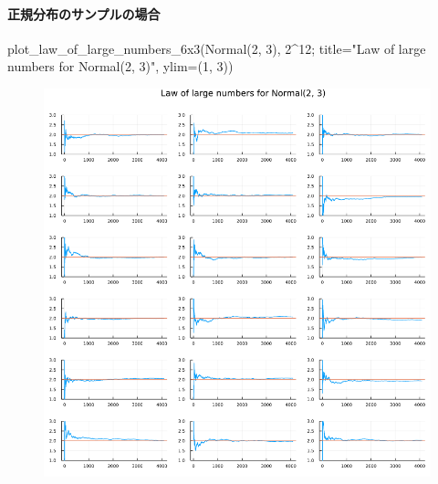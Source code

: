\documentclass[
  letterpaper,
  DIV=11,
  numbers=noendperiod]{scrartcl}
\let\oldparagraph\paragraph
\renewcommand{\paragraph}[1]{\oldparagraph{#1}\mbox{}}
\newenvironment{Shaded}{\begin{snugshade}}{\end{snugshade}}
\newcommand{\FloatTok}[1]{\textcolor[rgb]{0.68,0.00,0.00}{#1}}
\newcommand{\FunctionTok}[1]{\textcolor[rgb]{0.28,0.35,0.67}{#1}}
\newcommand{\NormalTok}[1]{\textcolor[rgb]{0.00,0.23,0.31}{#1}}
\newcommand{\OperatorTok}[1]{\textcolor[rgb]{0.37,0.37,0.37}{#1}}
\newcommand{\StringTok}[1]{\textcolor[rgb]{0.13,0.47,0.30}{#1}}
\begin{document}
\hypertarget{ux6b63ux898fux5206ux5e03ux306eux30b5ux30f3ux30d7ux30ebux306eux5834ux5408}{%
\paragraph{正規分布のサンプルの場合}\label{ux6b63ux898fux5206ux5e03ux306eux30b5ux30f3ux30d7ux30ebux306eux5834ux5408}}

\begin{Shaded}
\begin{Highlighting}[]
\FunctionTok{plot\_law\_of\_large\_numbers\_6x3}\NormalTok{(}\FunctionTok{Normal}\NormalTok{(}\FloatTok{2}\NormalTok{, }\FloatTok{3}\NormalTok{), }\FloatTok{2}\OperatorTok{\^{}}\FloatTok{12}\NormalTok{;}
\NormalTok{    title}\OperatorTok{=}\StringTok{"Law of large numbers for Normal(2, 3)"}\NormalTok{, ylim}\OperatorTok{=}\NormalTok{(}\FloatTok{1}\NormalTok{, }\FloatTok{3}\NormalTok{))}
\end{Highlighting}
\end{Shaded}

\begin{figure}[H]

{\centering \includegraphics{05 Central limit theorem_files/figure-pdf/cell-14-output-1.png}

}

\end{figure}
\end{document}

